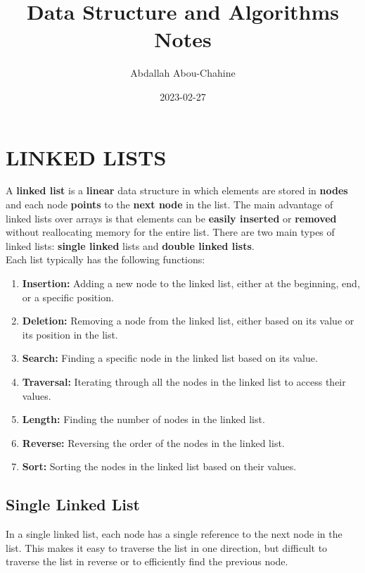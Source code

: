 \documentclass{article}
\title{Data Structure and Algorithms Notes}
\author{Abdallah Abou-Chahine}
\date{2023-02-27}
\begin{document}
\maketitle

\section{LINKED LISTS}
A \textbf{linked list} is a \textbf{linear} data structure in which elements are stored in \textbf{nodes} and each node \textbf{points} to the \textbf{next node} in the list. The main advantage of linked lists over arrays is that elements can be\textbf{ easily inserted} or \textbf{removed} without reallocating memory for the entire list. There are two main types of linked lists: \textbf{single linked} lists and \textbf{double linked lists}.\\

Each list typically has the following functions:

\begin{enumerate}[label=\arabic*., wide=0pt, labelwidth=!, labelsep=5pt]

    \item \textbf{Insertion:} Adding a new node to the linked list, either at the beginning, end, or a specific position.

    \item \textbf{Deletion:} Removing a node from the linked list, either based on its value or its position in the list.

    \item \textbf{Search:} Finding a specific node in the linked list based on its value.

    \item \textbf{Traversal:} Iterating through all the nodes in the linked list to access their values.

    \item \textbf{Length:} Finding the number of nodes in the linked list.

    \item \textbf{Reverse:} Reversing the order of the nodes in the linked list.

    \item \textbf{Sort:} Sorting the nodes in the linked list based on their values.

\end{enumerate}
\newpage
\subsection[short]{Single Linked List}
In a single linked list, each node has a single reference to the next node in the list. This makes it easy to traverse the list in one direction, but difficult to traverse the list in reverse or to efficiently find the previous node.\\
\end{document}
